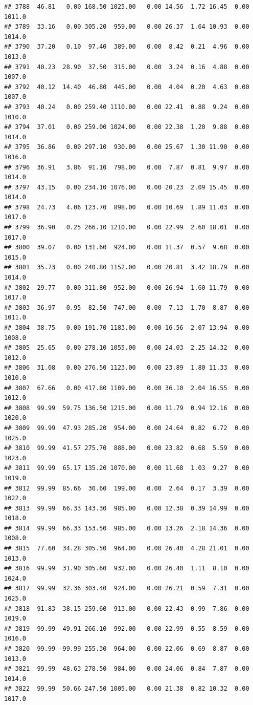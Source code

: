 \documentclass{article}\usepackage{graphicx, color}
\makeatletter
\newenvironment{kframe}{%
 \def\at@end@of@kframe{}%
 \ifinner\ifhmode%
  \def\at@end@of@kframe{\end{minipage}}%
  \begin{minipage}{\columnwidth}%
 \fi\fi%
 \def\FrameCommand##1{\hskip\@totalleftmargin \hskip-\fboxsep
 \colorbox{shadecolor}{##1}\hskip-\fboxsep
     \hskip-\linewidth \hskip-\@totalleftmargin \hskip\columnwidth}%
 \MakeFramed {\advance\hsize-\width
   \@totalleftmargin\z@ \linewidth\hsize
   \@setminipage}}%
 {\par\unskip\endMakeFramed%
 \at@end@of@kframe}
\newenvironment{knitrout}{}{} %
\makeatother
\begin{document}
\begin{knitrout}
\begin{kframe}
\begin{verbatim}
## 3788  46.81   0.00 168.50 1025.00   0.00 14.56  1.72 16.45  0.00 1011.0
## 3789  33.16   0.00 305.20  959.00   0.00 26.37  1.64 10.93  0.00 1014.0
## 3790  37.20   0.10  97.40  389.00   0.00  8.42  0.21  4.96  0.00 1013.0
## 3791  40.23  28.90  37.50  315.00   0.00  3.24  0.16  4.88  0.00 1007.0
## 3792  40.12  14.40  46.80  445.00   0.00  4.04  0.20  4.63  0.00 1007.0
## 3793  40.24   0.00 259.40 1110.00   0.00 22.41  0.88  9.24  0.00 1010.0
## 3794  37.01   0.00 259.00 1024.00   0.00 22.38  1.20  9.88  0.00 1014.0
## 3795  36.86   0.00 297.10  930.00   0.00 25.67  1.30 11.90  0.00 1016.0
## 3796  36.91   3.86  91.10  798.00   0.00  7.87  0.81  9.97  0.00 1014.0
## 3797  43.15   0.00 234.10 1076.00   0.00 20.23  2.09 15.45  0.00 1014.0
## 3798  24.73   4.06 123.70  898.00   0.00 10.69  1.89 11.03  0.00 1017.0
## 3799  36.90   0.25 266.10 1210.00   0.00 22.99  2.60 18.01  0.00 1017.0
## 3800  39.07   0.00 131.60  924.00   0.00 11.37  0.57  9.68  0.00 1015.0
## 3801  35.73   0.00 240.80 1152.00   0.00 20.81  3.42 18.79  0.00 1014.0
## 3802  29.77   0.00 311.80  952.00   0.00 26.94  1.60 11.79  0.00 1017.0
## 3803  36.97   0.95  82.50  747.00   0.00  7.13  1.70  8.87  0.00 1011.0
## 3804  38.75   0.00 191.70 1183.00   0.00 16.56  2.07 13.94  0.00 1008.0
## 3805  25.65   0.00 278.10 1055.00   0.00 24.03  2.25 14.32  0.00 1012.0
## 3806  31.08   0.00 276.50 1123.00   0.00 23.89  1.80 11.33  0.00 1010.0
## 3807  67.66   0.00 417.80 1109.00   0.00 36.10  2.04 16.55  0.00 1012.0
## 3808  99.99  59.75 136.50 1215.00   0.00 11.79  0.94 12.16  0.00 1020.0
## 3809  99.99  47.93 285.20  954.00   0.00 24.64  0.82  6.72  0.00 1025.0
## 3810  99.99  41.57 275.70  888.00   0.00 23.82  0.68  5.59  0.00 1023.0
## 3811  99.99  65.17 135.20 1070.00   0.00 11.68  1.03  9.27  0.00 1019.0
## 3812  99.99  85.66  30.60  199.00   0.00  2.64  0.17  3.39  0.00 1022.0
## 3813  99.99  66.33 143.30  985.00   0.00 12.38  0.39 14.99  0.00 1018.0
## 3814  99.99  66.33 153.50  985.00   0.00 13.26  2.18 14.36  0.00 1008.0
## 3815  77.60  34.28 305.50  964.00   0.00 26.40  4.28 21.01  0.00 1013.0
## 3816  99.99  31.90 305.60  932.00   0.00 26.40  1.11  8.10  0.00 1024.0
## 3817  99.99  32.36 303.40  924.00   0.00 26.21  0.59  7.31  0.00 1025.0
## 3818  91.83  38.15 259.60  913.00   0.00 22.43  0.99  7.86  0.00 1019.0
## 3819  99.99  49.91 266.10  992.00   0.00 22.99  0.55  8.59  0.00 1016.0
## 3820  99.99 -99.99 255.30  964.00   0.00 22.06  0.69  8.87  0.00 1013.0
## 3821  99.99  48.63 278.50  984.00   0.00 24.06  0.84  7.87  0.00 1014.0
## 3822  99.99  50.66 247.50 1005.00   0.00 21.38  0.82 10.32  0.00 1017.0

\end{verbatim}
\end{kframe}
\end{knitrout}
\end{document}
